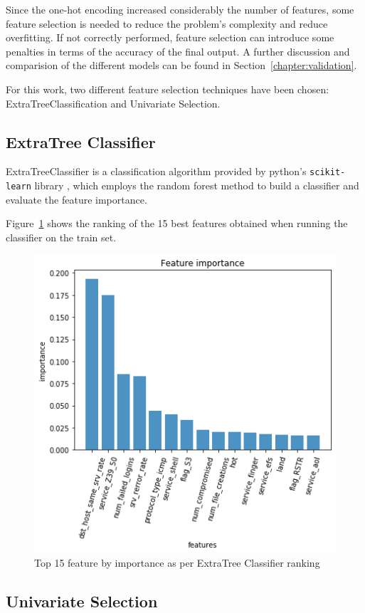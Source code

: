 Since the one-hot encoding increased considerably the number of features, some feature selection is needed to reduce the problem's complexity and reduce overfitting. If not correctly performed, feature selection can introduce some penalties in terms of the accuracy of the final output. A further discussion and comparision of the different models can be found in Section~\ref{chapter:validation}.

For this work, two different feature selection techniques have been chosen: ExtraTreeClassification and Univariate Selection.

\subsection{ExtraTree Classifier}

ExtraTreeClassifier is a classification algorithm provided by python's  \texttt{scikit-learn} library \cite{extratree}, which employs the random forest method to build a classifier and evaluate the feature importance.

Figure~\ref{fig:classtree} shows the ranking of the 15 best features obtained when running the classifier on the train set.

\begin{figure}[h]
    \centering
    \includegraphics[width=0.7\linewidth]{img/extratree.png}
    \caption{Top 15 feature by importance as per ExtraTree Classifier ranking}
    \label{fig:classtree}
\end{figure}

\subsection{Univariate Selection}

